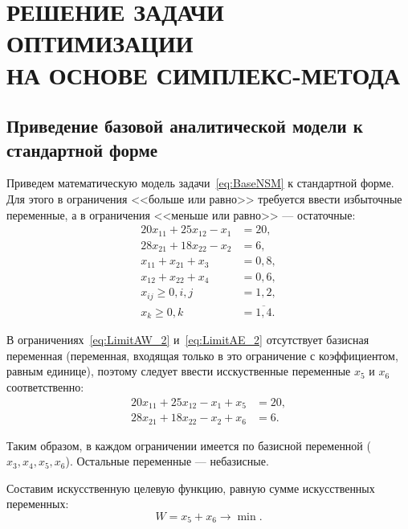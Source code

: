 \section[Решение задачи оптимизации на основе симплекс-метода]{РЕШЕНИЕ ЗАДАЧИ ОПТИМИЗАЦИИ \\ НА ОСНОВЕ СИМПЛЕКС-МЕТОДА}

\subsection{Приведение базовой аналитической модели к стандартной форме}

Приведем математическую модель задачи~\eqref{eq:BaseNSM} к стандартной форме.
Для этого в ограничения <<больше или равно>> требуется ввести избыточные
переменные, а в ограничения <<меньше или равно>> --- остаточные:
\begin{align}
  \label{eq:LimitAW_2}
  20x_{11} + 25x_{12} - x_{1} & = 20, \\
  \label{eq:LimitAE_2}
  28x_{21} + 18x_{22} - x_{2} & = 6, \\
  \nonumber
  x_{11} + x_{21} + x_{3} & = 0{,}8, \\
  \nonumber
  x_{12} + x_{22} + x_{4} & = 0{,}6, \\ 
  \nonumber
  x_{ij} \ge 0, i, j & = 1, 2, \\
  \nonumber
  x_{k} \ge 0,  k &= \overline{1,4}. 
\end{align}

В ограничениях~\eqref{eq:LimitAW_2} и~\eqref{eq:LimitAE_2}
отсутствует базисная переменная (переменная, входящая только в это
ограничение с коэффициентом, равным единице), поэтому следует
ввести исскуственные переменные $ x_{5}$ и $ x_{6} $ соответственно:
\begin{equation}
  \begin{aligned}
    20x_{11} + 25x_{12} - x_{1} + x_{5} & = 20, \\
    28x_{21} + 18x_{22} - x_{2} + x_{6} & = 6.
  \end{aligned}
\end{equation}

Таким образом, в каждом ограничении имеется по базисной переменной
($ x_{3}, x_{4}, x_{5}, x_{6}$). Остальные переменные --- небазисные.

Составим искусственную целевую функцию, равную сумме искусственных переменных:
\begin{equation}
  W = x_{5} + x_{6} \rightarrow \min.
\end{equation}

